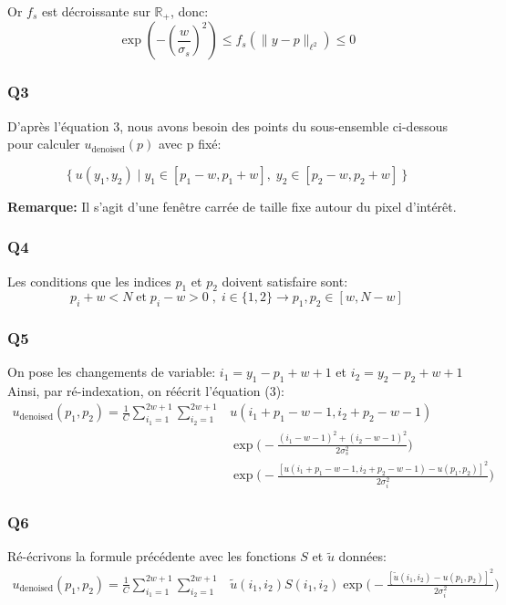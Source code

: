 \documentclass{article}
\begin{document}
Or $f_s$ est décroissante sur $\mathbb{R}_+$, donc: $$\exp(-(\frac{w}{\sigma_s})^2) \leq f_s(\parallel y-p \parallel_{\ell^2}) \leq 0 $$

\subsubsection*{Q3} D'après l'équation 3, nous avons besoin des points du sous-ensemble ci-dessous pour calculer $u_\text{denoised}(p)$ avec p fixé: 

$$\big \{ \: u(y_1, y_2) \;|\; y_1 \in {[p_1 - w, p_1 + w]}, \; y_2 \in {[p_2 - w, p_2 + w]}\: \big \}  $$

\textbf{Remarque: } Il s'agit d'une fenêtre carrée de taille fixe autour du pixel d'intérêt.
\subsubsection*{Q4}
Les conditions que les indices $p_1$ et $p_2$ doivent satisfaire sont:
 $$p_i + w < N \;\text{et}\; p_i - w > 0 \;,\; i \in \{1, 2\} \rightarrow p_1, p_2 \in {[w, N-w]}$$
\subsubsection*{Q5}
On pose les changements de variable: $i_1 = y_1 - p_1 + w + 1$ et $i_2 = y_2 - p_2 + w + 1$
Ainsi, par ré-indexation, on réécrit l'équation (3):
\begin{equation*}\begin{split}
u_\text{denoised}(p_1, p_2) = \frac{1}{C} \displaystyle\sum_{i_1 = 1}^{2w + 1}
\displaystyle\sum_{i_2 = 1}^{2w + 1} & u(i_1+p_1 - w - 1, i_2 + p_2 - w - 1) \\
& \exp{ \big ( - \frac{(i_1 - w - 1)^2 + (i_2 -w -1)^2 }{2\sigma_s^2} \big )} \\
& \exp{ \big ( - \frac{[u(i_1 + p_1 - w - 1, i_2 + p_2 - w - 1) - u(p_1, p_2)]^2}{2\sigma_i^2} \big )}
\end{split}\end{equation*}

\subsubsection*{Q6}
Ré-écrivons la formule précédente avec les fonctions $S$ et $\tilde{u}$ données:
\begin{equation*}\begin{split}
u_\text{denoised}(p_1, p_2) = \frac{1}{C} \displaystyle\sum_{i_1 = 1}^{2w + 1}
\displaystyle\sum_{i_2 = 1}^{2w + 1} & \tilde{u}(i_1, i_2) S(i_1,i_2) \exp{ \big ( - \frac{[\tilde{u}(i_1, i_2) - u(p_1, p_2)]^2}{2\sigma_i^2} \big )}
\end{split}\end{equation*}
\end{document}

